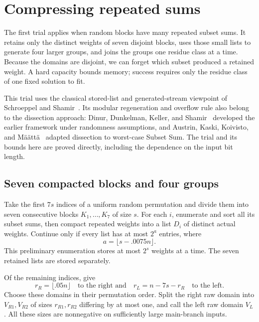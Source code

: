 \section{Compressing repeated sums}
\label{sec:compression}

The first trial applies when random blocks have many repeated subset
sums. It retains only the distinct weights of seven disjoint blocks,
uses those small lists to generate four larger groups, and joins the
groups one residue class at a time. Because the domains are disjoint,
we can forget which subset produced a retained weight. A hard
capacity bounds memory; success requires only the residue class of
one fixed solution to fit.

This trial uses the classical stored-list and generated-stream
viewpoint of Schroeppel and Shamir~\cite{SS81}. Its modular
regeneration and overflow rule also belong to the dissection approach:
Dinur, Dunkelman, Keller, and Shamir~\cite{DDKS12} developed the
earlier framework under randomness assumptions, and Austrin, Kaski,
Koivisto, and M\"a\"att\"a~\cite{AKKM13} adapted dissection to
worst-case Subset Sum. The trial and its bounds here are proved
directly, including the dependence on the input bit length.

\subsection{Seven compacted blocks and four groups}

Take the first $7s$ indices of a uniform random permutation and divide
them into seven consecutive blocks $K_1,\ldots,K_7$ of size $s$.
For each $i$, enumerate and sort all its subset sums, then compact
repeated weights into a list $D_i$ of distinct actual weights.
Continue only if every list has at most $2^a$ entries, where
\begin{equation}
\label{comp:block-cap}
 a=\lfloor s-.0075n\rfloor.
\end{equation}
This preliminary enumeration stores at most $2^s$ weights at a time.
The seven retained lists are stored separately.

Of the remaining indices, give
\[
 r_R=\lfloor .05n\rfloor
 \quad\text{to the right and}\quad
 r_L=n-7s-r_R
 \quad\text{to the left}.
\]
Choose these domains in their permutation order. Split the right raw
domain into $V_{R1},V_{R2}$ of sizes $r_{R1},r_{R2}$ differing by
at most one, and call the left raw domain $V_L$.
All these sizes are nonnegative on sufficiently large main-branch
inputs.

